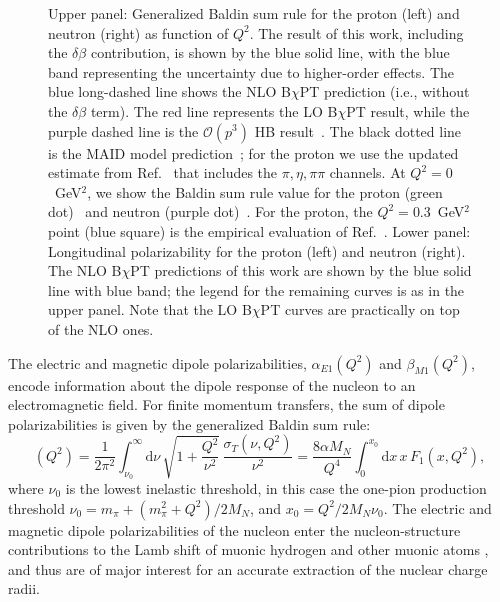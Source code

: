 \documentclass[12pt,preprint,tightenlines,
showpacs,preprintnumbers,amsmath,amssymb,
a4paper,nofootinbib]{revtex4-2}
\def\beq{\begin{equation}}
\def\eeq{\end{equation}}
\def\al{\alpha}
\def\dd{\mathrm{d}}
\begin{document}
\begin{figure}[hbt]
\begin{center}
\caption{\small{Upper panel: Generalized Baldin sum rule for the proton (left) and neutron (right) as function of $Q^2$.  
The result of this work, including the $\delta\beta$ contribution, is shown by the blue solid line, with the blue band representing the uncertainty due to higher-order effects. The blue long-dashed line shows the NLO B$\chi$PT prediction (i.e., without the $\delta\beta$ term).
The red line represents the LO B$\chi$PT result, while the purple dashed line is the $\mathcal{O}(p^3)$ HB result~\cite{Nevado:2007dd}.
The black dotted line is the MAID model prediction~\cite{Drechsel:2000ct,Drechsel:1998hk,private-Lothar};  for the proton we use the updated estimate from Ref.~\cite{Drechsel:2002ar} that includes the $\pi, \eta, \pi\pi$ channels.
At $Q^2=0$~GeV$^2$, we show the Baldin sum rule value for the proton (green dot)~\cite{Gryniuk:2015aa} and neutron (purple dot)~\cite{Levchuk:1999zy}.
 For the proton, the $Q^2=0.3$~GeV$^2$ point (blue square) is the empirical evaluation of Ref.~\cite{Liang:2004tk}. Lower panel: Longitudinal polarizability for the proton (left) and neutron (right). The NLO B$\chi$PT predictions of this work are shown by the blue solid line with blue band; the legend for the remaining curves is as in the upper panel. Note that the LO B$\chi$PT curves are practically on top of the NLO ones.}\label{Fig:alpha+betaplot}}
\end{center}
\end{figure}


The electric and magnetic dipole polarizabilities, $\alpha_{E1}(Q^2)$ and $\beta_{M1}(Q^2)$, encode information about the dipole response of the nucleon to an electromagnetic field. For finite momentum transfers, the sum of dipole polarizabilities is given by the generalized Baldin sum rule:
\beq
[\alpha_{E1}+\beta_{M1}] (Q^2)= \frac{1}{2 \pi^2} \int_{\nu_0}^\infty \! \dd\nu\,\sqrt{1+\frac{Q^2}{\nu^2}}\, \frac{\sigma_T (\nu,Q^2)}{\nu^2} =\frac{8 \al M_N}{Q^4}\int_0^{x_0}\!\dd x\, x \,F_1(x,Q^2),\label{Eq:alpha+betaQ2}
\eeq
where $\nu_0$ is the lowest inelastic threshold, in this case the one-pion production threshold $\nu_0=m_\pi + (m_\pi^2+Q^2)/2M_N$, and $x_0=Q^2/2M_N \nu_0$.
The electric and magnetic dipole polarizabilities of the nucleon enter the nucleon-structure contributions
to the Lamb shift of muonic hydrogen and other muonic atoms \cite{Bernabeu:1982qy,Pachucki:1996zza,Carlson:2011zd,Alarcon:2013cba}, and thus
are of major interest for an accurate extraction of the nuclear charge radii.
\end{document}
